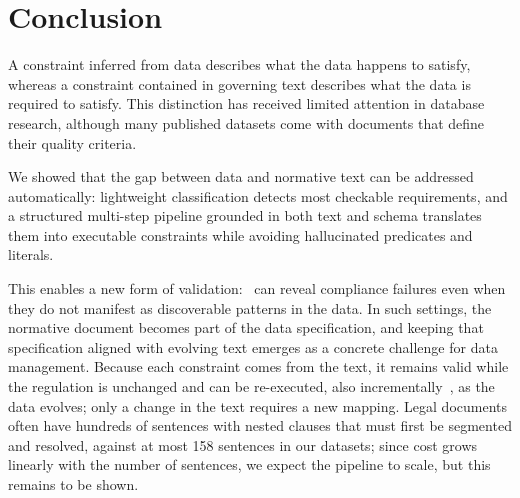 \section{Conclusion}
\label{sec:conclusion}

A constraint inferred from data describes what the data happens to satisfy, whereas a constraint contained in governing text describes what the data is required to satisfy. This distinction has received limited attention in database research, although many published datasets come with documents that define their quality criteria. 

We showed that the gap between data and normative text can be addressed automatically: lightweight classification detects most checkable requirements, and a structured multi-step pipeline grounded in both text and schema translates them into executable constraints while avoiding hallucinated predicates and literals. 

This enables a new form of validation: \system\ can reveal compliance failures even when they do not manifest as discoverable patterns in the data. In such settings, the normative document becomes part of the data specification, and keeping that specification aligned with evolving text emerges as a concrete challenge for data management. Because each constraint comes from the text, it remains valid while the regulation is unchanged and can be re-executed, also incrementally~\cite{youri2024}, as the data evolves; only a change in the text requires a new mapping. Legal documents often have hundreds of sentences with nested clauses that must first be segmented and resolved, against at most 158 sentences in our datasets; since cost grows linearly with the number of sentences, we expect the pipeline to scale, but this remains to be shown.


